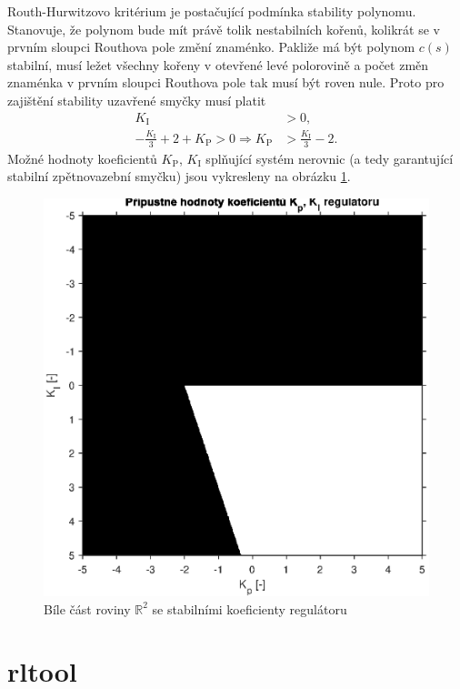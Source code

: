 \documentclass[twoside]{article}
\begin{document}
Routh-Hurwitzovo kritérium je postačující podmínka stability polynomu. Stanovuje, že polynom bude mít právě tolik nestabilních kořenů, kolikrát se v prvním sloupci
Routhova pole změní znaménko. Pakliže má být polynom $c(s)$ stabilní, musí ležet všechny kořeny v otevřené levé polorovině a počet změn znaménka v prvním sloupci
Routhova pole tak musí být roven nule. Proto pro zajištění stability uzavřené smyčky musí platit
\begin{equation}
	\begin{split}
		K_\text{I} &> 0, \\
		-\frac{K_\text{I}}{3} + 2 + K_\text{P} > 0 \Rightarrow K_\text{P} &> \frac{K_\text{I}}{3} - 2.
	\end{split}
\end{equation}
Možné hodnoty koeficientů $K_\text{P}$, $K_\text{I}$ splňující systém nerovnic (a tedy garantující stabilní zpětnovazební smyčku) jsou vykresleny na obrázku \ref{fig:mozne_hodnoty}.

\begin{figure}
	\centering
	\includegraphics[width=0.8\linewidth]{stabilni_koeficienty.eps}
	\caption{Bíle část roviny $\mathbb{R}^2$ se stabilními koeficienty regulátoru}
	\label{fig:mozne_hodnoty}
\end{figure}

\section{rltool}
\end{document}
